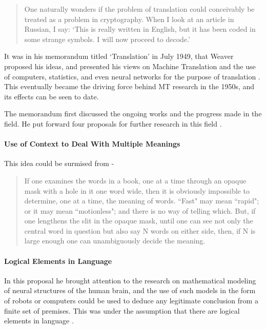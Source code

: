 \begin{quote}
    One naturally wonders if the problem of translation could conceivably be treated as a problem in cryptography. When I look at an article in Russian, I say: `This is really written in English, but it has been coded in some strange symbols. I will now proceed to decode.'
\end{quote}

It was in his memorandum titled `Translation' in July 1949, that Weaver proposed his ideas, and presented his views on Machine Translation and the use of computers, statistics, and even neural networks for the purpose of translation \cite{hutchins1999warren}. This eventually became the driving force behind MT research in the 1950s, and its effects can be seen to date.

The memorandum first discussed the ongoing works and the progress made in the field. He put forward four proposals for further research in this field \cite{hutchins1999warren}.

\paragraph{Use of Context to Deal With Multiple Meanings} This idea could be surmised from -

\begin{quote}
    If one examines the words in a book, one at a time through an opaque mask with a hole in it one word wide, then it is obviously impossible to determine, one at a time, the meaning of words. ``Fast" may mean ``rapid"; or it may mean ``motionless"; and there is no way of telling which. But, if one lengthens the slit in the opaque mask, until one can see not only the central word in question but also say N words on either side, then, if N is large enough one can unambiguously decide the meaning. \cite{hutchins1999warren} \cite{weaver1952translation}
\end{quote}

\paragraph{Logical Elements in Language} In this proposal he brought attention to the research on mathematical modeling of neural structures of the human brain, and the use of such models in the form of robots or computers could be used to deduce any legitimate conclusion from a finite set of premises. This was under the assumption that there are logical elements in language \cite{weaver1952translation}.

